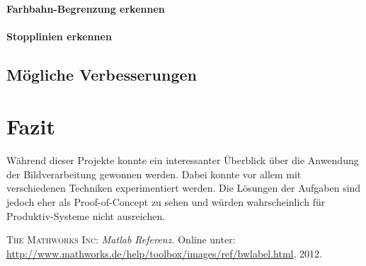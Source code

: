 \documentclass[a4paper,DIV=calc,ngerman]{scrartcl}
\begin{document}
\paragraph{Farhbahn-Begrenzung erkennen}

\paragraph{Stopplinien erkennen}


\subsection{Mögliche Verbesserungen}
\label{sec:a2verbesserungen}



\section{Fazit}
\label{sec:Fazit}
Während dieser Projekte konnte ein interessanter Überblick über die Anwendung der Bildverarbeitung gewonnen werden. Dabei konnte vor allem mit verschiedenen Techniken experimentiert werden. Die Lösungen der Aufgaben sind jedoch eher als Proof-of-Concept zu sehen und würden wahrscheinlich für Produktiv-Systeme nicht ausreichen.




\begin{thebibliography}{------}
\label{sec:Literatur}

 \textsc{The Mathworks Inc}: {\em Matlab Referenz.} Online unter: \url{http://www.mathworks.de/help/toolbox/images/ref/bwlabel.html}, 2012.





\end{thebibliography}
\end{document}
